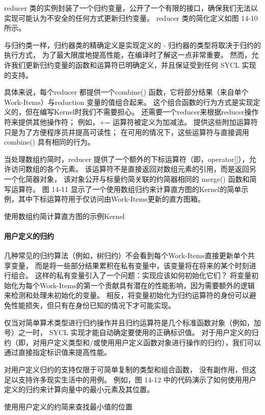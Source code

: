 reducer 类的实例封装了一个归约变量，公开了一个有限的接口，确保我们无法以实现可能认为不安全的任何方式更新归约变量。 
reducer 类的简化定义如图 14-10 所示。

与归约类一样，归约器类的精确定义是实现定义的 - 归约器的类型将取决于归约的执行方式，
为了最大限度地提高性能，在编译时了解这一点非常重要。 
然而，允许我们更新归约变量的函数和运算符已明确定义，并且保证受到任何 SYCL 实现的支持。

具体来说，每个reducer 都提供一个combine() 函数，它将部分结果（来自单个Work-Items）与reduction 变量的值组合起来。 
这个组合函数的行为方式是实现定义的，但在编写Kernel时我们不需要担心。 
还需要一个reducer来根据reducer操作符来提供其他操作符； 
例如，+= 运算符被定义为加减法。 提供这些附加运算符只是为了方便程序员并提高可读性； 
在可用的情况下，这些运算符与直接调用combine() 具有相同的行为。

当处理数组约简时，reducer 提供了一个额外的下标运算符（即，operator[]），允许访问数组的各个元素。 
该运算符不是直接返回对数组元素的引用，而是返回另一个化简器对象，
该对象公开与标量约简关联的约简器相同的 merge() 函数和简写运算符。 
图 14-11 显示了一个使用数组归约来计算直方图的Kernel的简单示例，其中下标运算符用于仅访问由Work-Items更新的直方图箱。

{\color{red} 使用数组约简计算直方图的示例Kernel}

\paragraph{用户定义的归约}

几种常见的归约算法（例如，树归约）不会看到每个Work-Items直接更新单个共享变量，
而是将一些部分结果累积在私有变量中，该变量将在将来的某个时刻进行组合。 
这样的私有变量引入了一个问题：实现应该如何初始化它们？ 
将变量初始化为每个Work-Items的第一个贡献具有潜在的性能影响，因为需要额外的逻辑来检测和处理未初始化的变量。 
相反，将变量初始化为归约运算符的身份可以避免性能损失，但只有在身份已知的情况下才可能实现。

仅当对简单算术类型进行归约操作并且归约运算符是几个标准函数对象（例如，加号）之一时，
SYCL 实现才能自动确定要使用的正确标识值。 
对于用户定义的归约（即，对用户定义类型和/或使用用户定义函数对象进行操作的归约），我们可以通过直接指定标识值来提高性能。

对用户定义归约的支持仅限于可简单复制的类型和组合函数，
没有副作用，但这足以支持许多现实生活中的用例。 
例如，图 14-12 中的代码演示了如何使用用户定义的归约来计算向量中的最小元素及其位置。

{\color{red} 使用用户定义的约简来查找最小值的位置}

